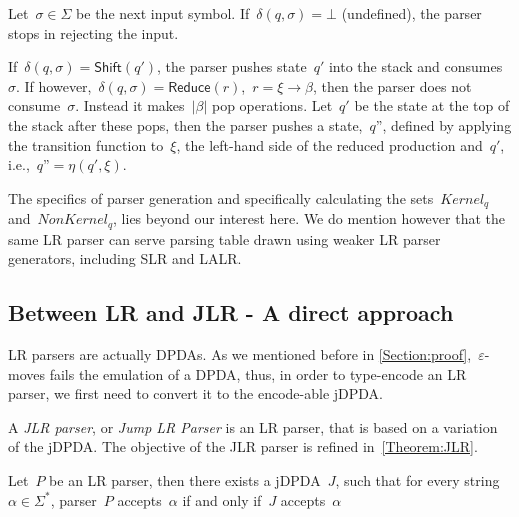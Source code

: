 Let~$σ∈Σ$ be the next input symbol.
If~$δ(q,σ)=⊥$ (undefined), the parser stops in rejecting the input.

If~$δ(q,σ) = \textsf{Shift}(q')$, the parser pushes state~$q'$
into the stack and consumes~$σ$.
If however,~$δ(q,σ) = \textsf{Reduce}(r)$,~$r=ξ→β$,
then the parser does not consume~$σ$.
Instead it makes~$|β|$ pop operations.
Let~$q'$ be the state at the top of the stack after these pops, then
the parser pushes a state,~$q”$,
defined by applying the transition function to~$ξ$, the left-hand side of the reduced production and~$q'$,
i.e.,~$q”=η(q',ξ)$.

The specifics of parser generation and specifically
  calculating the sets~$Kernel_{q}$ and~$NonKernel_{q}$, lies beyond our interest here.
We do mention however that the same LR parser can serve parsing table drawn using weaker LR parser generators,
including SLR and LALR\@.

\subsection{Between LR and JLR - A direct approach}
LR parsers are actually DPDAs\@. As we mentioned before in \cref{Section:proof},~$ε$-moves
  fails the emulation of a DPDA, thus, in order to type-encode an LR parser, we first need
  to convert it to the encode-able jDPDA\@.

A \emph{JLR parser}, or \emph{Jump LR Parser} is an LR parser, that
  is based on a variation of the jDPDA\@.
The objective of the JLR parser is refined in~\cref{Theorem:JLR}.

\begin{Theorem}
  \label{Theorem:JLR}
  Let~$P$ be an LR parser, then there exists a jDPDA~$J$,
  such that for every string~$α∈Σ^*$, parser~$P$ accepts~$α$
    if and only if~$J$ accepts~$α$
\end{Theorem}


